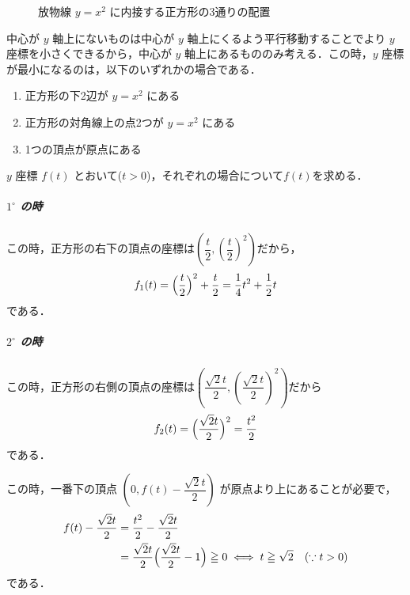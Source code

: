 \documentclass[../../main.tex]{subfiles}
\begin{document}
\begin{figure}[htb]
  \caption{放物線 $y=x^2$ に内接する正方形の3通りの配置}
\end{figure}

中心が $y$ 軸上にないものは中心が $y$ 軸上にくるよう平行移動することでより $y$ 座標を小さくできるから，中心が $y$ 軸上にあるもののみ考える．この時，$y$ 座標が最小になるのは，以下のいずれかの場合である．

\begin{enumerate}
  \item[$1^\circ$] 正方形の下2辺が $y=x^2$ にある
  \item[$2^\circ$] 正方形の対角線上の点2つが $y=x^2$ にある
  \item[$3^\circ$] 1つの頂点が原点にある
\end{enumerate}

$y$ 座標 $f(t)$ とおいて($t > 0$)，それぞれの場合について$f(t)$を求める．

\subparagraph{$1^\circ$ の時}

この時，正方形の右下の頂点の座標は$\left(\dfrac{t}{2},\left(\dfrac{t}{2}\right)^2\right)$だから，
\begin{align}
  f_1(t) = \Bigl(\dfrac{t}{2}\Bigr)^2 + \dfrac{t}{2} = \dfrac{1}{4}t^2 + \dfrac{1}{2}t \label{eq:1}
\end{align}
である．

\subparagraph{$2^\circ$ の時}

この時，正方形の右側の頂点の座標は$\left(\dfrac{\sqrt{2}t}{2},\left(\dfrac{\sqrt{2}t}{2}\right)^2\right)$だから
\begin{align}
  f_2(t) = \Bigl(\dfrac{\sqrt{2}t}{2}\Bigr)^2 = \dfrac{t^2}{2} \label{eq:2}
\end{align}
である．

この時，一番下の頂点 $\left(0, f(t) - \dfrac{\sqrt{2}t}{2}\right)$ が原点より上にあることが必要で，
\begin{align}
  f(t) - \dfrac{\sqrt{2}t}{2}
  &= \dfrac{t^2}{2} - \dfrac{\sqrt{2}t}{2} \\
  &= \dfrac{\sqrt{2}t}{2}\Bigl(\dfrac{\sqrt{2}t}{2} - 1\Bigr) \geqq 0 \iff t \geqq \sqrt{2} \quad (\because t > 0) \label{eq:3}
\end{align}
である．
\end{document}
